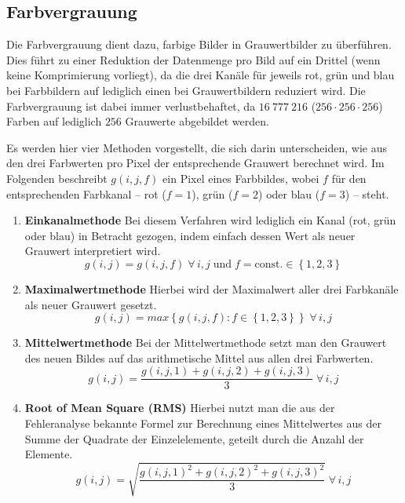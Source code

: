 \subsection{Farbvergrauung}

Die Farbvergrauung dient dazu, farbige Bilder in Grauwertbilder zu überführen. Dies führt zu einer Reduktion der Datenmenge pro Bild auf ein Drittel (wenn keine Komprimierung vorliegt), da die drei Kanäle für jeweils rot, grün und blau bei Farbbildern auf lediglich einen bei Grauwertbildern reduziert wird.\newline
Die Farbvergrauung ist dabei immer verlustbehaftet, da $16~777~216$ ($256 \cdot 256 \cdot 256$) Farben auf lediglich $256$ Grauwerte abgebildet werden.

Es werden hier vier Methoden vorgestellt, die sich darin unterscheiden, wie aus den drei Farbwerten pro Pixel der entsprechende Grauwert berechnet wird.\newline
Im Folgenden beschreibt $g(i,j,f)$ ein Pixel eines Farbbildes, wobei $f$ für den entsprechenden Farbkanal -- rot ($f=1$), grün ($f=2$) oder blau ($f=3$) -- steht. 
\begin{enumerate}
	\item \textbf{Einkanalmethode} \newline
	Bei diesem Verfahren wird lediglich ein Kanal (rot, grün oder blau) in Betracht gezogen, indem einfach dessen Wert als neuer Grauwert interpretiert wird.
	\begin{equation}
	g(i,j)=g(i,j,f)\;\forall\,i,j\;\text{und}\; f = \text{const.} \in\left\lbrace 1,2,3\right\rbrace 
	\end{equation}
	
	\item \textbf{Maximalwertmethode} \newline
	Hierbei wird der Maximalwert aller drei Farbkanäle als neuer Grauwert gesetzt.
	\begin{equation}
	g(i,j)=max\left\lbrace g(i,j,f):f\in\left\lbrace 1,2,3\right\rbrace \right\rbrace \;\forall\,i,j 
	\end{equation}
	\item \textbf{Mittelwertmethode} \newline
	Bei der Mittelwertmethode setzt man den Grauwert des neuen Bildes auf das arithmetische Mittel aus allen drei Farbwerten. 
	\begin{equation}
	g(i,j)=\frac{g(i,j,1)+g(i,j,2)+g(i,j,3)}{3}\;\forall\,i,j
	\end{equation}
	\pagebreak
	\item \textbf{Root of Mean Square (RMS)} \newline
	Hierbei nutzt man die aus der Fehleranalyse bekannte Formel zur Berechnung eines Mittelwertes aus der Summe der Quadrate der Einzelelemente, geteilt durch die Anzahl der Elemente.
	\begin{equation}
	g(i,j)=\sqrt{\frac{g(i,j,1)^{2}+g(i,j,2)^{2}+g(i,j,3)^{2}}{3}}\;\forall\,i,j
	\end{equation}
\end{enumerate}

